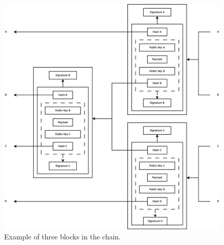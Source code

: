 \begin{figure}
	\centerline{\includegraphics[scale=0.3]{design/figs/chain.eps}}
	\caption{Example of three blocks in the chain.}
	\label{fig:chain-example}
\end{figure}